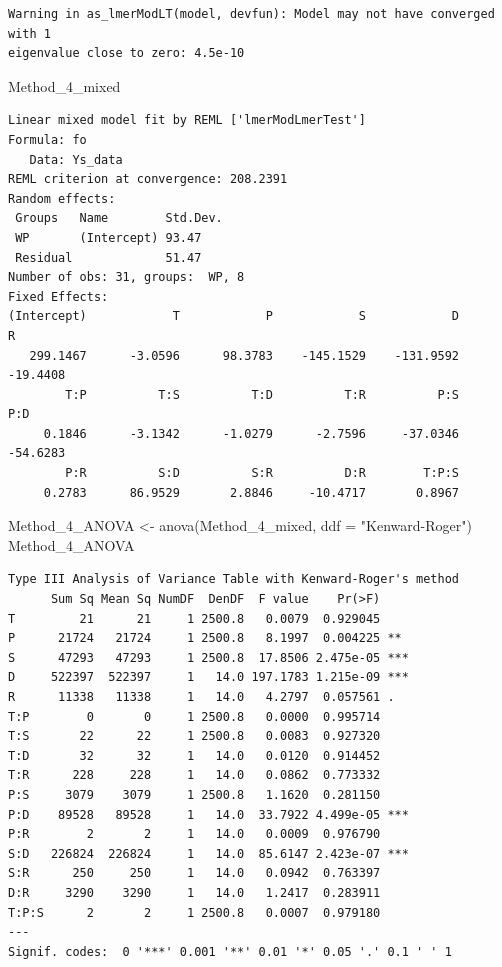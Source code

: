 \documentclass[
  letterpaper,
  DIV=11,
  numbers=noendperiod]{scrartcl}
\newenvironment{Shaded}{\begin{snugshade}}{\end{snugshade}}
\newcommand{\AttributeTok}[1]{\textcolor[rgb]{0.40,0.45,0.13}{#1}}
\newcommand{\FunctionTok}[1]{\textcolor[rgb]{0.28,0.35,0.67}{#1}}
\newcommand{\NormalTok}[1]{\textcolor[rgb]{0.00,0.23,0.31}{#1}}
\newcommand{\OtherTok}[1]{\textcolor[rgb]{0.00,0.23,0.31}{#1}}
\newcommand{\StringTok}[1]{\textcolor[rgb]{0.13,0.47,0.30}{#1}}
\begin{document}
\begin{verbatim}
Warning in as_lmerModLT(model, devfun): Model may not have converged with 1
eigenvalue close to zero: 4.5e-10
\end{verbatim}

\begin{Shaded}
\begin{Highlighting}[]
\NormalTok{Method\_4\_mixed}
\end{Highlighting}
\end{Shaded}

\begin{verbatim}
Linear mixed model fit by REML ['lmerModLmerTest']
Formula: fo
   Data: Ys_data
REML criterion at convergence: 208.2391
Random effects:
 Groups   Name        Std.Dev.
 WP       (Intercept) 93.47   
 Residual             51.47   
Number of obs: 31, groups:  WP, 8
Fixed Effects:
(Intercept)            T            P            S            D            R  
   299.1467      -3.0596      98.3783    -145.1529    -131.9592     -19.4408  
        T:P          T:S          T:D          T:R          P:S          P:D  
     0.1846      -3.1342      -1.0279      -2.7596     -37.0346     -54.6283  
        P:R          S:D          S:R          D:R        T:P:S  
     0.2783      86.9529       2.8846     -10.4717       0.8967  
\end{verbatim}

\begin{Shaded}
\begin{Highlighting}[]
\NormalTok{Method\_4\_ANOVA }\OtherTok{\textless{}{-}} \FunctionTok{anova}\NormalTok{(Method\_4\_mixed, }\AttributeTok{ddf =} \StringTok{"Kenward{-}Roger"}\NormalTok{)}
\NormalTok{Method\_4\_ANOVA}
\end{Highlighting}
\end{Shaded}

\begin{verbatim}
Type III Analysis of Variance Table with Kenward-Roger's method
      Sum Sq Mean Sq NumDF  DenDF  F value    Pr(>F)    
T         21      21     1 2500.8   0.0079  0.929045    
P      21724   21724     1 2500.8   8.1997  0.004225 ** 
S      47293   47293     1 2500.8  17.8506 2.475e-05 ***
D     522397  522397     1   14.0 197.1783 1.215e-09 ***
R      11338   11338     1   14.0   4.2797  0.057561 .  
T:P        0       0     1 2500.8   0.0000  0.995714    
T:S       22      22     1 2500.8   0.0083  0.927320    
T:D       32      32     1   14.0   0.0120  0.914452    
T:R      228     228     1   14.0   0.0862  0.773332    
P:S     3079    3079     1 2500.8   1.1620  0.281150    
P:D    89528   89528     1   14.0  33.7922 4.499e-05 ***
P:R        2       2     1   14.0   0.0009  0.976790    
S:D   226824  226824     1   14.0  85.6147 2.423e-07 ***
S:R      250     250     1   14.0   0.0942  0.763397    
D:R     3290    3290     1   14.0   1.2417  0.283911    
T:P:S      2       2     1 2500.8   0.0007  0.979180    
---
Signif. codes:  0 '***' 0.001 '**' 0.01 '*' 0.05 '.' 0.1 ' ' 1
\end{verbatim}
\end{document}
